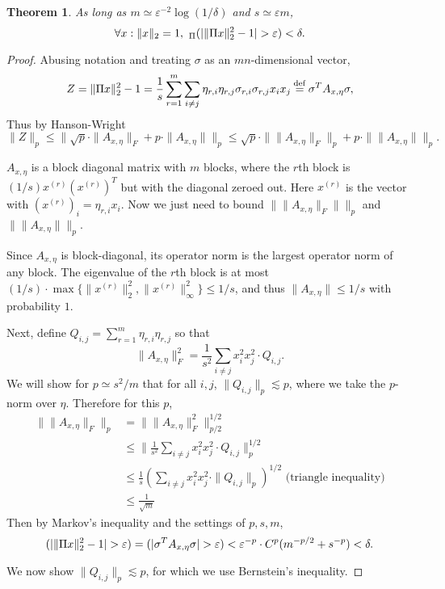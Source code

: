 \documentclass[12pt]{article}
\let\Pr\relax
\DeclareMathOperator*{\Pr}{\mathbb{P}}
\newcommand{\eps}{\varepsilon}
\newcommand{\eqdef}{\mathbin{\stackrel{\rm def}{=}}}
\newtheorem{theorem}{Theorem}
\begin{document}
\begin{theorem}
As long as $m \simeq \eps^{-2}\log(1/\delta)$ and $s\simeq \eps m$,
\begin{equation}
\forall x : \|x\|_2 = 1,\ \Pr_{\Pi}(| \|\Pi x\|_2^2 - 1 | > \eps) < \delta .
\end{equation}
\end{theorem}

\begin{proof}
Abusing notation and treating $\sigma$ as an $mn$-dimensional vector,
$$
Z = \|\Pi x\|_2^2 - 1 = \frac 1s \sum_{r=1}^m\sum_{i\neq j} \eta_{r,i}\eta_{r,j} \sigma_{r,i}\sigma_{r,j} x_i x_j \eqdef \sigma^T A_{x,\eta} \sigma ,
$$
Thus by Hanson-Wright
$$\|Z\|_p \le \|\sqrt{p}\cdot\|A_{x,\eta}\|_F + p\cdot\|A_{x,\eta}\|\|_p \le \sqrt{p}\cdot\|\|A_{x,\eta}\|_F\|_p + p\cdot\|\|A_{x,\eta}\|\|_p .$$

$A_{x,\eta}$ is a block diagonal matrix with $m$ blocks, where the $r$th block is $(1/s) x^{(r)} (x^{(r)})^T$ but with the diagonal zeroed out. Here $x^{(r)}$ is the vector with $(x^{(r)})_i = \eta_{r,i} x_i$. Now we just need to bound $\|\|A_{x,\eta}\|_F\|\|_p$ and $\|\|A_{x,\eta}\|\|_p$.

Since $A_{x,\eta}$ is block-diagonal, its operator norm is the largest operator norm of any block. The eigenvalue of the $r$th block is at most $(1/s)\cdot \max\{ \|x^{(r)}\|_2^2, \|x^{(r)}\|_\infty^2\} \le 1/s$, and thus $\|A_{x,\eta}\| \le 1/s$ with probability $1$.

Next, define $Q_{i,j} = \sum_{r=1}^m \eta_{r,i} \eta_{r,j}$ so that
$$
\|A_{x,\eta}\|_F^2 = \frac 1{s^2} \sum_{i\neq j} x_i^2 x_j^2 \cdot Q_{i,j} .
$$
We will show for $p \simeq s^2/m$ that for all $i, j$, $\|Q_{i,j}\|_p \lesssim p$, where we take the $p$-norm over $\eta$. Therefore for this $p$,
\allowdisplaybreaks
\begin{align*}
\|\|A_{x,\eta}\|_F\|_p &= \|\|A_{x,\eta}\|_F^2\|_{p/2}^{1/2}\\
{}&\le\|\frac 1{s^2} \sum_{i\neq j} x_i^2 x_j^2\cdot Q_{i,j}\|_p^{1/2}\\
{}&\le \frac 1{s} \left(\sum_{i\neq j} x_i^2 x_j^2\cdot \|Q_{i,j}\|_p\right)^{1/2}\text{ (triangle inequality)}\\
{}&\le \frac 1{\sqrt{m}}
\end{align*}
Then by Markov's inequality and the settings of $p, s, m$,
$$
\Pr(|\|\Pi x\|_2^2 - 1| > \eps) = \Pr(|\sigma^T A_{x,\eta}\sigma| > \eps) < \eps^{-p}\cdot C^p(m^{-p/2} + s^{-p}) < \delta .
$$

We now show $\|Q_{i,j}\|_p \lesssim p$, for which we use Bernstein's inequality.


\end{proof}
\end{document}
